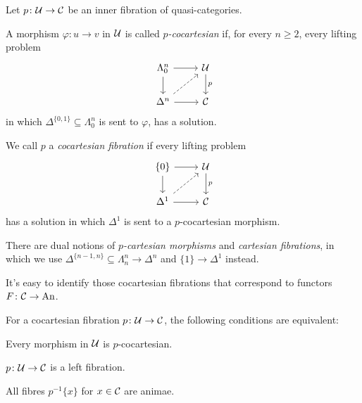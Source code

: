 \begin{defi}\label{def:Cocartesian}
	Let $p\colon \mathcal{U}\rightarrow\mathcal{C}$ be an inner fibration of quasi-categories.
	\begin{alphanumerate}
		\item A morphism $\varphi\colon u\rightarrow v$ in $\mathcal{U}$ is called \emph{$p$-cocartesian} if, for every $n\geqslant 2$, every lifting problem\label{enum:CocartesianMorphism}
		\begin{equation*}
			\begin{tikzcd}
				\Lambda_0^n\rar\dar & \Uu\dar["p"]\\
				\Delta^n\urar[dashed]\rar & \Cc
			\end{tikzcd}
		\end{equation*}
		in which $\Delta^{\{0,1\}}\subseteq \Lambda_0^n$ is sent to $\varphi$, has a solution.
		\item We call $p$ a \emph{cocartesian fibration} if every lifting problem\label{enum:CocartesianFibration}
		\begin{equation*}
			\begin{tikzcd}
				\{0\}\rar\dar & \Uu\dar["p"]\\
				\Delta^1\urar[dashed]\rar & \Cc
			\end{tikzcd}
		\end{equation*}
		has a solution in which $\Delta^1$ is sent to a $p$-cocartesian morphism.
	\end{alphanumerate}
	There are dual notions of \emph{$p$-cartesian morphisms} and \emph{cartesian fibrations}, in which we use $\Delta^{\{n-1,n\}}\subseteq \Lambda_n^n\rightarrow \Delta^n$ and $\{1\}\rightarrow \Delta^1$ instead.
\end{defi}
It's easy to identify those cocartesian fibrations that correspond to functors $F\colon \mathcal{C}\rightarrow \mathrm{An}$.
\begin{lem}\label{lem:CocartesianLeft}
	For a cocartesian fibration $p\colon \mathcal{U}\rightarrow\mathcal{C}$, the following conditions are equivalent:
	\begin{alphanumerate}
		\item Every morphism in $\mathcal{U}$ is $p$-cocartesian.\label{enum:EveryMorphismCocartesian}
		\item $p\colon \mathcal{U}\rightarrow \mathcal{C}$ is a left fibration.\label{enum:CocartesianLeft}
		\item All fibres $p^{-1}\{x\}$ for $x\in\mathcal{C}$ are animae.\label{enum:FibresAreAnimae}
	\end{alphanumerate}
\end{lem}

